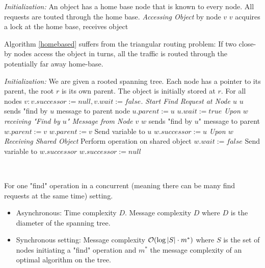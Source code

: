 \documentclass[11pt, oneside]{book}   						%
\begin{document}
\begin{algorithm}
\caption{}\label{homebased}
\begin{algorithmic}[1]
\Statex\textit{Initialization:} {An object has a home base node that is known to every node. All requests are touted through the home base.}
\Statex
\Statex\textit{Accessing Object} {by node $v$}
	\State $v$ acquires a lock at the home base, receives object
\end{algorithmic}
\end{algorithm}
\begin{myremark}Algorithm \ref{homebased} suffers from the triangular routing problem: If two close-by nodes access the object in turns, all the traffic is routed through the potentially far away home-base.
\end{myremark}

\begin{algorithm}[H]
\caption{}\label{arrow}
\begin{algorithmic}[1]
\Statex\textit{Initialization:} {We are given a rooted spanning tree. Each node has a pointer to its parent, the root $r$ is its own parent. The object is initially stored at $r$. For all nodes $v: v.successor:=null, v.wait:=false$.}
\Statex
\Statex\textit{Start Find Request at Node $u$}
\Atomic
	\State $u$ sends "find by $u$ message to parent node
	\State $u.parent := u$
	\State $u.wait := true$
\EndAtomic
\Statex
\Statex\textit{Upon $w$ receiving "Find by $u$" Message from Node $v$}
\Atomic
		\State $w$ sends "find by $u$" message to parent
		\State $w.parent := v$
	\Else
		\State $w.parent := v$
			\State Send variable to $u$
		\Else
			\State $w.successor := u$
		\EndIf
		\EndIf
\EndAtomic
\Statex
\Statex\textit{Upon $w$ Receiving Shared Object}
\State Perform operation on shared object
\Atomic
	\State $w.wait := false$
		\State Send variable to $w.successor$
		\State $w.successor := null$
	\EndIf
\EndAtomic
\end{algorithmic}
\end{algorithm}\hfill\\
\begin{mythm} For one "find" operation in a concurrent (meaning there can be many find requests at the same time) setting.
\begin{itemize}
	\item Asynchronous: Time complexity $D$. Message complexity $D$ where $D$ is the diameter of the spanning tree. 
	\item Synchronous setting: Message complexity $\mathcal{O}(\log\left\vert S \right\vert\cdot m^*)$ where $S$ is the set of nodes initiating a "find" operation and $m^*$ the message complexity of an optimal algorithm on the tree.
\end{itemize}\end{mythm}
\end{document}
